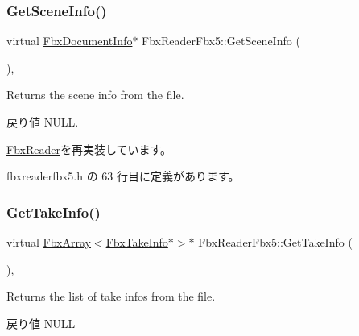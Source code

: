 \mbox{\label{class_fbx_reader_fbx5_af685112183765e2a278bbbc898374074}} 
\subsubsection{\texorpdfstring{Get\+Scene\+Info()}{GetSceneInfo()}}
{\footnotesize\ttfamily virtual \hyperlink{class_fbx_document_info}{Fbx\+Document\+Info}$\ast$ Fbx\+Reader\+Fbx5\+::\+Get\+Scene\+Info (\begin{DoxyParamCaption}{ }\end{DoxyParamCaption})\hspace{0.3cm}{\ttfamily [inline]}, {\ttfamily [virtual]}}

Returns the scene info from the file. \begin{DoxyReturn}{戻り値}
N\+U\+LL. 
\end{DoxyReturn}


\hyperlink{class_fbx_reader_acb928634641ad5f99d709478c7a234be}{Fbx\+Reader}を再実装しています。



 fbxreaderfbx5.\+h の 63 行目に定義があります。

\mbox{\label{class_fbx_reader_fbx5_a4680a5c4695d3692582d3ca8db71cd01}} 
\subsubsection{\texorpdfstring{Get\+Take\+Info()}{GetTakeInfo()}}
{\footnotesize\ttfamily virtual \hyperlink{class_fbx_array}{Fbx\+Array}$<$\hyperlink{class_fbx_take_info}{Fbx\+Take\+Info}$\ast$$>$$\ast$ Fbx\+Reader\+Fbx5\+::\+Get\+Take\+Info (\begin{DoxyParamCaption}{ }\end{DoxyParamCaption})\hspace{0.3cm}{\ttfamily [inline]}, {\ttfamily [virtual]}}

Returns the list of take infos from the file. \begin{DoxyReturn}{戻り値}
N\+U\+LL 
\end{DoxyReturn}


